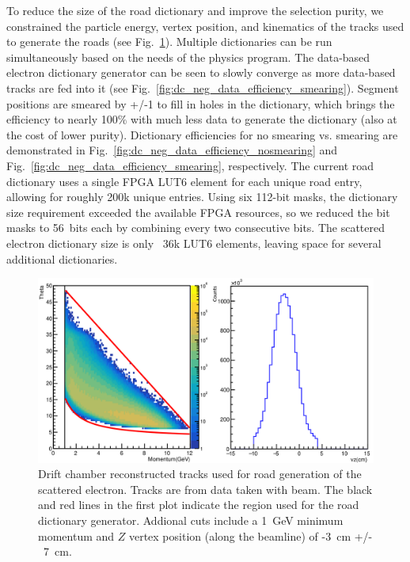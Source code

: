 To reduce the size of the road dictionary and improve the selection purity, we constrained the particle energy, vertex position, and kinematics of the tracks used to generate the roads (see Fig.~\ref{fig:dc_roads_electrons_data}). Multiple dictionaries can be run simultaneously based on the needs of the physics program. The data-based electron dictionary generator can be seen to slowly converge as more data-based tracks are fed into it (see Fig.~\ref{fig:dc_neg_data_efficiency_smearing}). Segment positions are smeared by +/-1 to fill in holes in the dictionary, which brings the efficiency to nearly 100\% with much less data to generate the dictionary (also at the cost of lower purity). Dictionary efficiencies for no smearing vs. smearing are demonstrated in Fig.~\ref{fig:dc_neg_data_efficiency_nosmearing} and Fig.~\ref{fig:dc_neg_data_efficiency_smearing}, respectively. The current road dictionary uses a single FPGA LUT6 element for each unique road entry, allowing for roughly 200k unique entries. Using six 112-bit masks, the dictionary size requirement exceeded the available FPGA resources, so we reduced the bit masks to 56~bits each by combining every two consecutive bits. The scattered electron dictionary size is only ~36k LUT6 elements, leaving space for several additional dictionaries.

\begin{figure}[hbt]
	\centering
	\includegraphics[width=1.0\columnwidth,keepaspectratio]{img/dc_roads_electrons_data.png}
	\caption{Drift chamber reconstructed tracks used for road generation of the scattered electron. Tracks are from data taken with beam. The black and red lines in the first plot indicate the region used for the road dictionary generator. Addional cuts include a 1~GeV minimum momentum and $Z$ vertex position (along the beamline) of -3~cm +/-~7~cm.}
	\label{fig:dc_roads_electrons_data}
\end{figure}

